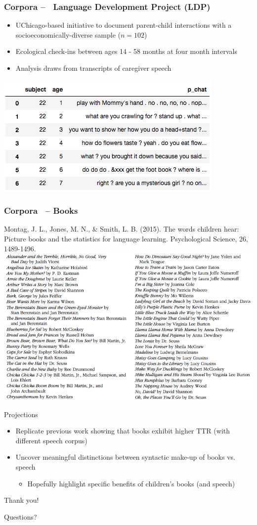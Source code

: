 \documentclass{beamer}
\begin{document}
\begin{frame}
	\frametitle{Corpora --  Language Development Project (LDP)}
	\begin{itemize}
		\item UChicago-based initiative to document parent-child interactions with a socioeconomically-diverse sample ($n=102$)
		\item Ecological check-ins between ages 14 - 58 months at four month intervals
		\item Analysis draws from transcripts of caregiver speech
	\end{itemize}
	\begin{center}
		\includegraphics[width=.6\linewidth]{ldp_excerpt.png}
	\end{center}

\end{frame}



\begin{frame}
	\frametitle{Corpora  -- Books}
	\footnotesize{Montag, J. L., Jones, M. N., \& Smith, L. B. (2015). The words children hear: Picture books and the statistics for language learning. Psychological Science, 26, 1489-1496.} 
	\vspace{5mm}
	\includegraphics[width=.9\linewidth]{kidbooks.png}
\end{frame}

\begin{frame}{Projections}
	\begin{itemize}
		\item Replicate previous work showing that books exhibit higher TTR (with different speech corpus)
		\item Uncover meaningful distinctions between syntactic make-up of books vs. speech
		\begin{itemize}
			\item Hopefully highlight specific benefits of children's books (and speech)
		\end{itemize}
	\end{itemize}

	
\end{frame}

\begin{frame}{Thank you!}
	\begin{center}
		\Huge Questions?
	\end{center}
\end{frame}
	
	
\end{document}
